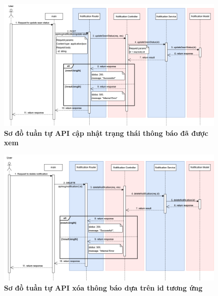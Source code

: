 \begin{figure}[H]
	\centering
	\includegraphics[width=16cm]{Images/api_sequence/noti/updateSeenStatus.drawio.png}
	\caption[Sơ đồ tuần tự API cập nhật trạng thái thông báo đã được xem]{\bfseries \fontsize{12pt}{0pt}\selectfont Sơ đồ tuần tự API cập nhật trạng thái thông báo đã được xem}
	\label{sequence_diagram_update_seen}
\end{figure}

\begin{figure}[H]
	\centering
	\includegraphics[width=16cm]{Images/api_sequence/noti/deleteNotification.drawio.png}
	\caption[Sơ đồ tuần tự API xóa thông báo dựa trên id tương ứng]{\bfseries \fontsize{12pt}{0pt}\selectfont Sơ đồ tuần tự API xóa thông báo dựa trên id tương ứng}
	\label{sequence_diagram_delete_notification}
\end{figure}
